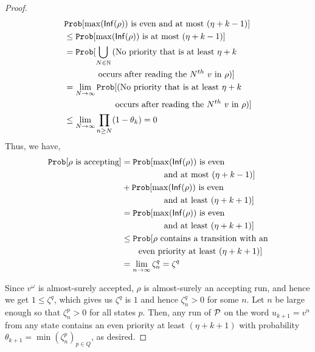 \begin{proof}
 
\begin{equation*}
    \begin{split}
        &\mathtt{Prob}[\max({\mathsf{Inf}}(\rho)) \text{ is even and at most $(\eta+k-1)$}] \\
        &\leq  \mathtt{Prob}[\max({\mathsf{Inf}}(\rho)) \text{ is at most $(\eta+k-1)$}]  \\ 
        &=\mathtt{Prob}[\bigcup_{N \in \mathbb{N}} \text{(No priority that is at least $\eta+k$ }\\
        &\quad\quad\quad\quad\text{occurs after reading the $N^{th}$ $v$ in $\rho$)} ] \\
        &=\lim_{N\to\infty}\mathtt{Prob}[\text{(No priority that is at least  $\eta+k$ }\\
        &\quad\quad\quad\quad\quad\quad\text{occurs after reading the $N^{th}$ $v$ in $\rho$)}] \\
        &\leq \lim_{N\to\infty} \prod_{n\geq N} (1-\theta_k) = 0
    \end{split}
\end{equation*}
Thus, we have, 
\begin{equation*}
    \begin{split}
        \mathtt{Prob}[\rho \text{ is accepting}]
        &= \mathtt{Prob}[\max({\mathsf{Inf}}(\rho)) \text{ is even }\\
        &\quad\quad\quad\quad\quad\text{and at most $(\eta+k-1)$}] \\
        &+ \mathtt{Prob}[\max({\mathsf{Inf}}(\rho)) \text{ is even }
        \\&\quad\quad\quad\quad\quad\text{and at least $(\eta+k+1)$}] \\
        &= \mathtt{Prob}[\max({\mathsf{Inf}}(\rho)) \text{ is even }\\
        &\quad\quad\quad\quad\quad\text{and at least $(\eta+k+1)$}] \\
        &\leq \mathtt{Prob}[\rho \text{ contains a transition with an} 
        \\ &\qquad\text{even priority at least $(\eta+k+1)$}] \\
        &=\lim_{n\to \infty} \zeta^q_n = \zeta^q\\
    \end{split} 
\end{equation*}
    
Since $v^{\omega}$ is almost-surely accepted, $\rho$ is almost-surely an accepting run, and hence we get $1 \leq \zeta^q$, which gives us $\zeta^q$ is $1$ and hence $\zeta^q_n>0$ for some $n$. Let $n$ be large enough so that $\zeta^p_n>0$ for all states $p$. Then, any run of $\mathcal{P}$ on the word $u_{k+1}=v^n$ from any state contains an even priority at least $(\eta+k+1)$ with probability $\theta_{k+1}=\min (\zeta^p_n)_{p \in Q}$, as desired.


\end{proof}
